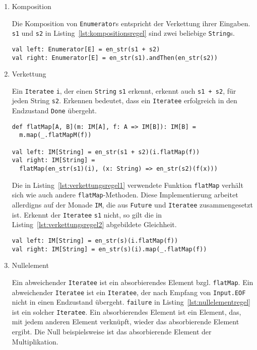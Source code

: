 \begin{enumerate}
  \item Komposition

    Die Komposition von \lstinline|Enumerator|s entspricht der Verkettung ihrer Eingaben.
    \lstinline|s1| und \lstinline|s2| in Listing~\ref{lst:kompositionsregel} sind zwei beliebige \lstinline|String|s.

    \begin{lstlisting}[caption=Kompositionsregel, label=lst:kompositionsregel]
val left: Enumerator[E] = en_str(s1 + s2)
val right: Enumerator[E] = en_str(s1).andThen(en_str(s2))
    \end{lstlisting}

  \item Verkettung

    Ein \lstinline|Iteratee| \lstinline|i|, der einen \lstinline|String| \lstinline|s1| erkennt, erkennt auch \lstinline|s1 + s2|, für jeden String \lstinline|s2|.
    Erkennen bedeutet, dass ein \lstinline|Iteratee| erfolgreich in den Endzustand \lstinline|Done| übergeht.

    \begin{lstlisting}[caption={Verkettungsregel, wenn ein Iteratee die Eingabe erkennt}, label=lst:verkettungsregel1]
def flatMap[A, B](m: IM[A], f: A => IM[B]): IM[B] =
  m.map(_.flatMapM(f))

val left: IM[String] = en_str(s1 + s2)(i.flatMap(f))
val right: IM[String] =
  flatMap(en_str(s1)(i), (x: String) => en_str(s2)(f(x)))
    \end{lstlisting}

    Die in Listing~\ref{lst:verkettungsregel1} verwendete Funktion \lstinline|flatMap| verhält sich wie auch andere \lstinline|flatMap|-Methoden.
    Diese Implementierung arbeitet allerdigns auf der Monade \lstinline|IM|, die aus \lstinline|Future| und \lstinline|Iteratee| zusammengesetzt ist.
    Erkennt der \lstinline|Iteratee| \lstinline|s1| nicht, so gilt die in Listing~\ref{lst:verkettungsregel2} abgebildete Gleichheit.

    \begin{lstlisting}[caption={Verkettungsregel, wenn ein Iteratee die Eingabe nicht erkennt}, label=lst:verkettungsregel2]
val left: IM[String] = en_str(s)(i.flatMap(f))
val right: IM[String] = en_str(s)(i).map(_.flatMap(f))
    \end{lstlisting}

  \item Nullelement

    Ein abweichender \lstinline|Iteratee| ist ein absorbierendes Element bzgl. \lstinline|flatMap|.
    Ein abweichender \lstinline|Iteratee| ist ein \lstinline|Iteratee|, der nach Empfang von \lstinline|Input.EOF| nicht in einen Endzustand übergeht.
    \lstinline|failure| in Listing~\ref{lst:nullelementregel} ist ein solcher \lstinline|Iteratee|.
    Ein absorbierendes Element ist ein Element, das, mit jedem anderen Element verknüpft, wieder das absorbierende Element ergibt.
    Die Null beispielsweise ist das absorbierende Element der Multiplikation.


\end{enumerate}

